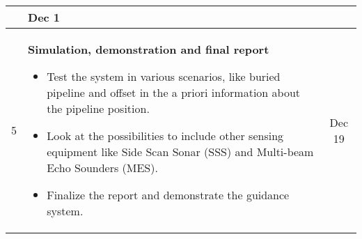 \documentclass[a4paper,10pt]{article}
\begin{document}
\begin{tabular}{| c | p{9cm} || c |}
\begin{itemize}
	 	 	               		\end{itemize}
								&	Dec 1 \\
	\hline
	5	&	\textbf{Simulation, demonstration and final report}
						\begin{itemize}
						 \item Test the system in various scenarios, like buried pipeline and offset in the a priori information about the pipeline position.
						 \item Look at the possibilities to include other sensing equipment like Side Scan Sonar (SSS) and Multi-beam Echo Sounders (MES).
						 \item Finalize the report and demonstrate the guidance system.
						\end{itemize}
								&	Dec 19 \\
	\hline
	\end{tabular}
\end{document}
